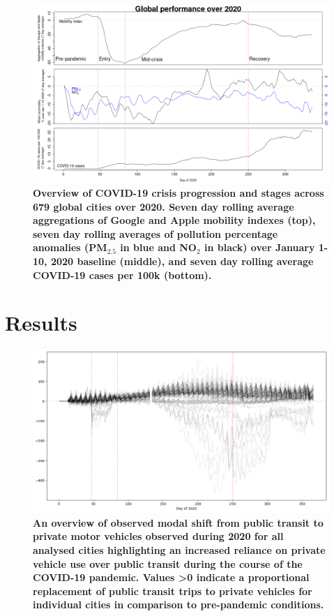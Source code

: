 \documentclass[preprint,12pt]{elsarticle}
\begin{document}
\begin{figure}
\centering
\includegraphics[trim={0 0 15 20},clip,scale=0.45]{Images/LancetPHOverall.png}
\caption{\bf Overview of COVID-19 crisis progression and stages across 679 global cities over 2020. Seven day rolling average aggregations of Google and Apple mobility indexes (top), seven day rolling averages of pollution percentage anomalies (PM$_{2.5}$ in blue and NO$_{2}$ in black) over January 1-10, 2020 baseline (middle), and seven day rolling average COVID-19 cases per 100k (bottom).}
 \label{fig:stages}
\end{figure}

\section*{Results}

\begin{figure}
\centering
\includegraphics[trim={0 0 0 0},clip,scale=0.4]{Images/DrivingvsTransit.png}
\caption{\bf An overview of observed modal shift from public transit to private motor vehicles observed during 2020 for all analysed cities highlighting an increased reliance on private vehicle use over public transit during the course of the COVID-19 pandemic. Values \textgreater 0 indicate a proportional replacement of public transit trips to private vehicles for individual cities in comparison to pre-pandemic conditions.}  
 \label{fig:driv_trans}
\end{figure}
\end{document}
